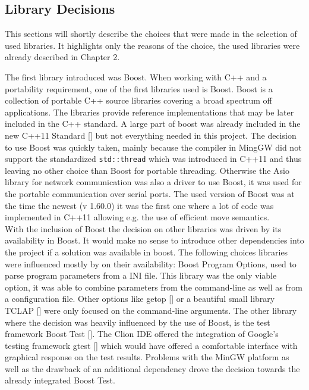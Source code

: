 \subsection{Library Decisions}
This sections will shortly describe the choices that were made in the selection of used libraries. It highlights only the reasons of the choice, the used libraries were already described in Chapter 2.

The first library introduced was Boost. When working with C++ and a portability requirement, one of the first libraries used is Boost. Boost is a collection of portable C++ source libraries covering a broad spectrum off applications. The libraries provide reference implementations that may be later included in the C++ standard. A large part of boost was already included in the new C++11 Standard [] but not everything needed in this project. The decision to use Boost was quickly taken, mainly because the compiler in MingGW did not support the standardized \texttt{std::thread} which was introduced in C++11 and thus leaving no other choice than Boost for portable threading. Otherwise the Asio library for network communication was also a driver to use Boost, it was used for the portable communication over serial ports. The used version of Boost was at the time the newest (v 1.60.0) it was the first one where a lot of code was implemented in C++11 allowing e.g. the use of efficient move semantics.\\
With the inclusion of Boost the decision on other libraries was driven by its availability in Boost. It would make no sense to introduce other dependencies into the project if a solution was available in boost. The following choices libraries were influenced mostly by on their availability: Boost Program Options, used to parse program parameters from a INI file. This library was the only viable option, it was able to combine parameters from the command-line as well as from a configuration file. Other options like getop [] or a beautiful small library TCLAP [] were only focused on the command-line arguments. The other library where the decision was heavily influenced by the use of Boost, is the test framework Boost Test []. The Clion IDE offered the integration of Google's testing framework gtest [] which would have offered a comfortable interface with graphical response on the test results. Problems with the MinGW platform as well as the drawback of an additional dependency drove the decision towards the already integrated Boost Test.

